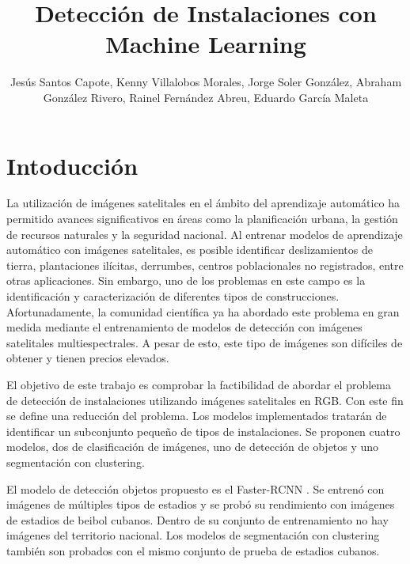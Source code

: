 \documentclass[article]{llncs}
\begin{document}
%
\title{Detecci\'on de Instalaciones con Machine Learning}
%
%
\author{Jes\'us Santos Capote, Kenny Villalobos Morales, Jorge Soler Gonz\'alez, Abraham Gonz\'alez Rivero, 
Rainel Fern\'andez Abreu, Eduardo Garc\'ia Maleta}
%
%
\maketitle              %
%



\section{Intoducci\'on}
La utilización de imágenes satelitales en el ámbito del aprendizaje automático ha permitido avances significativos en áreas como 
la planificación urbana, la gestión de recursos naturales y la seguridad nacional. Al entrenar modelos de aprendizaje automático con 
imágenes satelitales, es posible identificar deslizamientos de tierra, plantaciones ilícitas, derrumbes, centros poblacionales no 
registrados, entre otras aplicaciones. Sin embargo, uno de los problemas en este campo es la identificación y caracterización de 
diferentes tipos de construcciones. Afortunadamente, la comunidad científica ya ha abordado este problema en gran medida mediante 
el entrenamiento de modelos de detección con imágenes satelitales multiespectrales. A pesar de esto, este tipo de imágenes son 
difíciles de obtener y tienen precios elevados. 

El objetivo de este trabajo es comprobar la factibilidad de abordar el problema de detección de instalaciones utilizando im\'agenes satelitales 
en RGB. Con este fin se define una reducción del problema. Los modelos implementados tratar\'an de identificar un subconjunto 
pequeño de tipos de instalaciones. Se proponen cuatro modelos, dos de clasificación de im\'agenes, uno de detección de objetos y uno segmentaci\'on con clustering. 


El modelo de detección objetos propuesto es el Faster-RCNN \cite{FRCNN}. Se entren\'o con im\'agenes de m\'ultiples tipos de estadios y se 
prob\'o su rendimiento con im\'agenes de estadios de beibol cubanos. Dentro de su conjunto de entrenamiento no hay im\'agenes del 
territorio nacional. Los modelos de segmentación con clustering tambi\'en son probados con el mismo conjunto de prueba de estadios cubanos.
\end{document}
